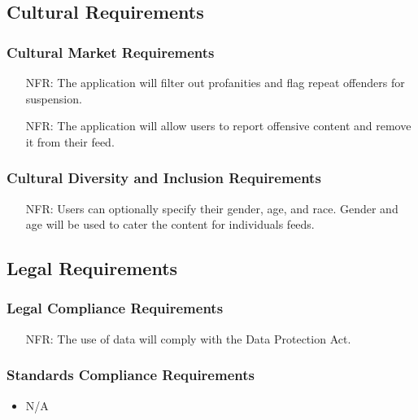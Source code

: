 \documentclass[12pt]{article}
\newcounter{nfrnum} %
\begin{document}
\subsection{Cultural Requirements}
  \subsubsection{Cultural Market Requirements}
    \noindent \begin{itemize}
      \item[NFR\refstepcounter{nfrnum}\thenfrnum:]
        The application will filter out profanities and flag repeat offenders for suspension.
      \item[NFR\refstepcounter{nfrnum}\thenfrnum:]
        The application will allow users to report offensive content and remove it from their feed.
    \end{itemize}
  \subsubsection{Cultural Diversity and Inclusion Requirements}
    \noindent \begin{itemize}
      \item[NFR\refstepcounter{nfrnum}\thenfrnum:]
        Users can optionally specify their gender, age, and race. Gender and age will be used to cater the content for individuals feeds.
    \end{itemize}

\subsection{Legal Requirements}
  \subsubsection{Legal Compliance Requirements}
    \noindent \begin{itemize}
      \item[NFR\refstepcounter{nfrnum}\thenfrnum:]
        The use of data will comply with the Data Protection Act.
    \end{itemize}
  \subsubsection{Standards Compliance Requirements}
    \noindent \begin{itemize}
      \item N/A
    \end{itemize}
\end{document}

